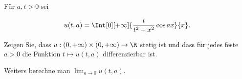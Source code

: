 
\begin{exercise}

Für $a, t > 0$ sei

\begin{align*}
    u(t, a)
    =
    \Int[0][+\infty]
    {
        \frac{t}{t^2 + x^2}
        \cos{a x}
    }{x}.
\end{align*}

Zeigen Sie, dass $u: (0, +\infty) \times (0, +\infty) \to \R$ stetig ist und dass für jedes feste $a > 0$ die Funktion $t \mapsto u(t, a)$ differenzierbar ist.

Weiters berechne man $\lim_{a \to 0} u(t, a)$.

\end{exercise}


